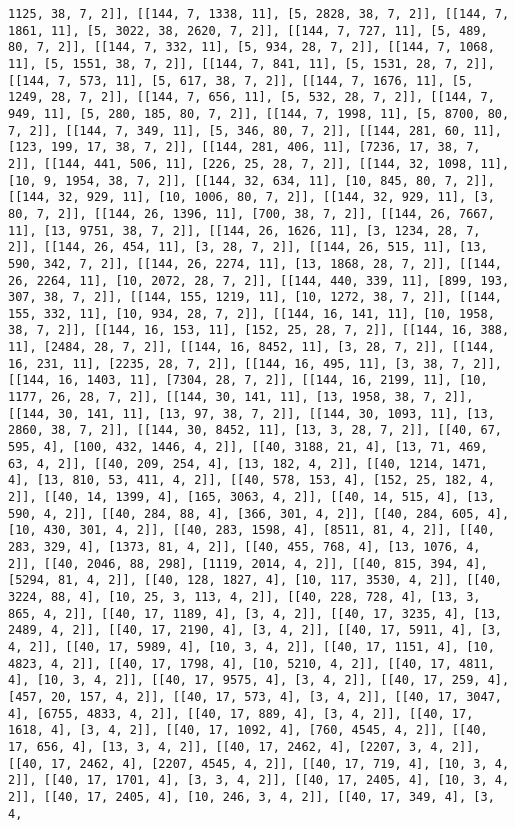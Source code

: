 \documentclass[12pt,fleqn]{article}\usepackage{../../common}
\begin{document}
\begin{verbatim}
1125, 38, 7, 2]], [[144, 7, 1338, 11], [5, 2828, 38, 7, 2]], [[144, 7, 1861, 11], [5, 3022, 38, 2620, 7, 2]], [[144, 7, 727, 11], [5, 489, 80, 7, 2]], [[144, 7, 332, 11], [5, 934, 28, 7, 2]], [[144, 7, 1068, 11], [5, 1551, 38, 7, 2]], [[144, 7, 841, 11], [5, 1531, 28, 7, 2]], [[144, 7, 573, 11], [5, 617, 38, 7, 2]], [[144, 7, 1676, 11], [5, 1249, 28, 7, 2]], [[144, 7, 656, 11], [5, 532, 28, 7, 2]], [[144, 7, 949, 11], [5, 280, 185, 80, 7, 2]], [[144, 7, 1998, 11], [5, 8700, 80, 7, 2]], [[144, 7, 349, 11], [5, 346, 80, 7, 2]], [[144, 281, 60, 11], [123, 199, 17, 38, 7, 2]], [[144, 281, 406, 11], [7236, 17, 38, 7, 2]], [[144, 441, 506, 11], [226, 25, 28, 7, 2]], [[144, 32, 1098, 11], [10, 9, 1954, 38, 7, 2]], [[144, 32, 634, 11], [10, 845, 80, 7, 2]], [[144, 32, 929, 11], [10, 1006, 80, 7, 2]], [[144, 32, 929, 11], [3, 80, 7, 2]], [[144, 26, 1396, 11], [700, 38, 7, 2]], [[144, 26, 7667, 11], [13, 9751, 38, 7, 2]], [[144, 26, 1626, 11], [3, 1234, 28, 7, 2]], [[144, 26, 454, 11], [3, 28, 7, 2]], [[144, 26, 515, 11], [13, 590, 342, 7, 2]], [[144, 26, 2274, 11], [13, 1868, 28, 7, 2]], [[144, 26, 2264, 11], [10, 2072, 28, 7, 2]], [[144, 440, 339, 11], [899, 193, 307, 38, 7, 2]], [[144, 155, 1219, 11], [10, 1272, 38, 7, 2]], [[144, 155, 332, 11], [10, 934, 28, 7, 2]], [[144, 16, 141, 11], [10, 1958, 38, 7, 2]], [[144, 16, 153, 11], [152, 25, 28, 7, 2]], [[144, 16, 388, 11], [2484, 28, 7, 2]], [[144, 16, 8452, 11], [3, 28, 7, 2]], [[144, 16, 231, 11], [2235, 28, 7, 2]], [[144, 16, 495, 11], [3, 38, 7, 2]], [[144, 16, 1403, 11], [7304, 28, 7, 2]], [[144, 16, 2199, 11], [10, 1177, 26, 28, 7, 2]], [[144, 30, 141, 11], [13, 1958, 38, 7, 2]], [[144, 30, 141, 11], [13, 97, 38, 7, 2]], [[144, 30, 1093, 11], [13, 2860, 38, 7, 2]], [[144, 30, 8452, 11], [13, 3, 28, 7, 2]], [[40, 67, 595, 4], [100, 432, 1446, 4, 2]], [[40, 3188, 21, 4], [13, 71, 469, 63, 4, 2]], [[40, 209, 254, 4], [13, 182, 4, 2]], [[40, 1214, 1471, 4], [13, 810, 53, 411, 4, 2]], [[40, 578, 153, 4], [152, 25, 182, 4, 2]], [[40, 14, 1399, 4], [165, 3063, 4, 2]], [[40, 14, 515, 4], [13, 590, 4, 2]], [[40, 284, 88, 4], [366, 301, 4, 2]], [[40, 284, 605, 4], [10, 430, 301, 4, 2]], [[40, 283, 1598, 4], [8511, 81, 4, 2]], [[40, 283, 329, 4], [1373, 81, 4, 2]], [[40, 455, 768, 4], [13, 1076, 4, 2]], [[40, 2046, 88, 298], [1119, 2014, 4, 2]], [[40, 815, 394, 4], [5294, 81, 4, 2]], [[40, 128, 1827, 4], [10, 117, 3530, 4, 2]], [[40, 3224, 88, 4], [10, 25, 3, 113, 4, 2]], [[40, 228, 728, 4], [13, 3, 865, 4, 2]], [[40, 17, 1189, 4], [3, 4, 2]], [[40, 17, 3235, 4], [13, 2489, 4, 2]], [[40, 17, 2190, 4], [3, 4, 2]], [[40, 17, 5911, 4], [3, 4, 2]], [[40, 17, 5989, 4], [10, 3, 4, 2]], [[40, 17, 1151, 4], [10, 4823, 4, 2]], [[40, 17, 1798, 4], [10, 5210, 4, 2]], [[40, 17, 4811, 4], [10, 3, 4, 2]], [[40, 17, 9575, 4], [3, 4, 2]], [[40, 17, 259, 4], [457, 20, 157, 4, 2]], [[40, 17, 573, 4], [3, 4, 2]], [[40, 17, 3047, 4], [6755, 4833, 4, 2]], [[40, 17, 889, 4], [3, 4, 2]], [[40, 17, 1618, 4], [3, 4, 2]], [[40, 17, 1092, 4], [760, 4545, 4, 2]], [[40, 17, 656, 4], [13, 3, 4, 2]], [[40, 17, 2462, 4], [2207, 3, 4, 2]], [[40, 17, 2462, 4], [2207, 4545, 4, 2]], [[40, 17, 719, 4], [10, 3, 4, 2]], [[40, 17, 1701, 4], [3, 3, 4, 2]], [[40, 17, 2405, 4], [10, 3, 4, 2]], [[40, 17, 2405, 4], [10, 246, 3, 4, 2]], [[40, 17, 349, 4], [3, 4, 
\end{verbatim}
\end{document}
